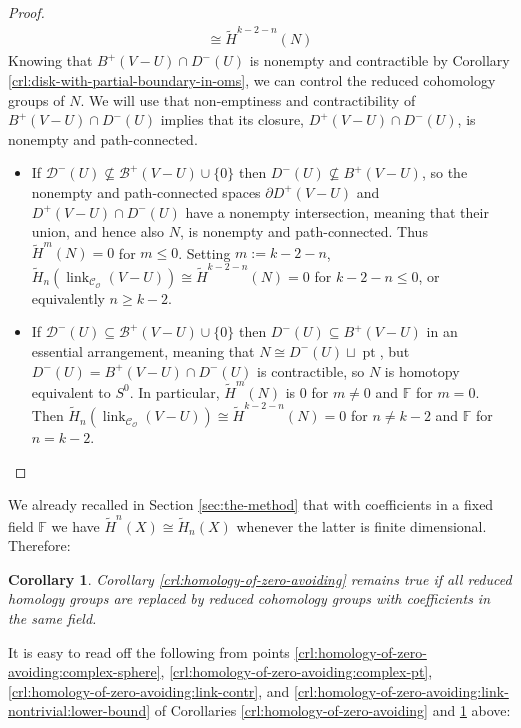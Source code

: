 \documentclass[a4paper,11pt,reqno, english]{amsart}
\newtheorem{corollary}[theorem]{Corollary}
\theoremstyle{definition}
\theoremstyle{remark}
\DeclareMathOperator{\link}{\mathrm{link}}
\begin{document}
\begin{proof}
\begin{multline*}
        \cong\tilde{H}^{k-2-n}(N)
    \end{multline*}
    Knowing that $B^+(V-U)\cap D^-(U)$ is nonempty and contractible by Corollary \ref{crl:disk-with-partial-boundary-in-oms}, we can control the reduced cohomology groups of $N$. We will use that non-emptiness and contractibility of $B^+(V-U)\cap D^-(U)$ implies that its closure, $D^+(V-U)\cap D^-(U)$, is nonempty and path-connected.
    \begin{itemize}
        \item[\ref{crl:homology-of-zero-avoiding:link-nontrivial:pass-to-boundary}] If $\mathscr{D}^-(U)\nsubseteq\mathscr{B}^+(V-U)\cup\{0\}$ then $D^-(U)\nsubseteq B^+(V-U)$, so the nonempty and path-connected spaces $\partial D^+(V-U)$ and $D^+(V-U)\cap D^-(U)$ have a nonempty intersection, meaning that their union, and hence also $N$, is nonempty and path-connected. Thus $\tilde{H}^m(N)=0$ for $m\leq 0$. Setting $m:=k-2-n$, $\tilde{H}_n(\link_{\mathscr{C}_\mathscr{O}}(V-U))\cong\tilde{H}^{k-2-n}(N)=0$ for $k-2-n\leq 0$, or equivalently $n\geq k-2$.
        \item[\ref{crl:homology-of-zero-avoiding:link-nontrivial:sphere}] If $\mathscr{D}^-(U)\subseteq\mathscr{B}^+(V-U)\cup\{0\}$ then $D^-(U)\subseteq B^+(V-U)$ in an essential arrangement, meaning that $N\cong D^-(U)\sqcup\operatorname{pt}$, but $D^-(U)=B^+(V-U)\cap D^-(U)$ is contractible, so $N$ is homotopy equivalent to $S^0$. In particular, $\tilde{H}^m(N)$ is $0$ for $m\neq 0$ and $\mathbb{F}$ for $m=0$. Then $\tilde{H}_n(\link_{\mathscr{C}_\mathscr{O}}(V-U))\cong\tilde{H}^{k-2-n}(N)=0$ for $n\neq k-2$ and $\mathbb{F}$ for $n=k-2$.
    \end{itemize}
\end{proof}
We already recalled in Section \ref{sec:the-method} that with coefficients in a fixed field $\mathbb{F}$ we have $\tilde{H}^n(X)\cong\tilde{H}_n(X)$ whenever the latter is finite dimensional. Therefore:
\begin{corollary}\label{crl:cohomology-of-zero-avoiding}
    Corollary \ref{crl:homology-of-zero-avoiding} remains true if all reduced homology groups are replaced by reduced cohomology groups with coefficients in the same field.
\end{corollary}
It is easy to read off the following from points \ref{crl:homology-of-zero-avoiding:complex-sphere}, \ref{crl:homology-of-zero-avoiding:complex-pt}, \ref{crl:homology-of-zero-avoiding:link-contr}, and \ref{crl:homology-of-zero-avoiding:link-nontrivial:lower-bound} of Corollaries \ref{crl:homology-of-zero-avoiding} and \ref{crl:cohomology-of-zero-avoiding} above:
\end{document}

